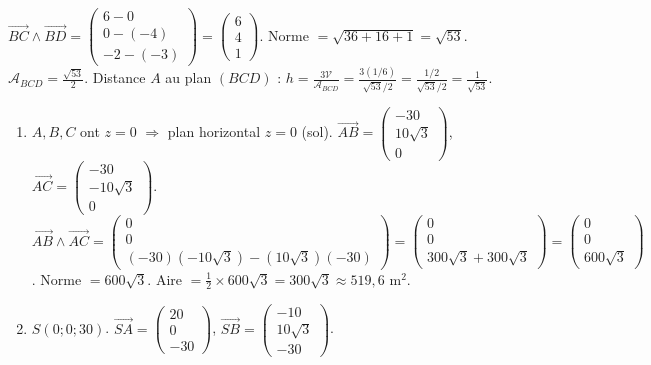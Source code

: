\documentclass[11pt]{article}
\begin{document}
\begin{corrige}[Exercice 2]
\begin{enumerate}
  $\overrightarrow{BC}\wedge\overrightarrow{BD} = \begin{pmatrix} 6-0 \\ 0-(-4) \\ -2-(-3) \end{pmatrix} = \begin{pmatrix}6\\4\\1\end{pmatrix}$. Norme $= \sqrt{36+16+1}=\sqrt{53}$.
  $\mathcal{A}_{BCD} = \frac{\sqrt{53}}{2}$.
  Distance $A$ au plan $(BCD)$ : $h = \frac{3\mathcal{V}}{\mathcal{A}_{BCD}} = \frac{3(1/6)}{\sqrt{53}/2} = \frac{1/2}{\sqrt{53}/2} = \frac{1}{\sqrt{53}}$.
\end{enumerate}
\end{corrige}

\begin{corrige}
\begin{enumerate}
  \item $A,B,C$ ont $z=0$ $\Rightarrow$ plan horizontal $z=0$ (sol).
  $\overrightarrow{AB}=\begin{pmatrix}-30\\10\sqrt{3}\\0\end{pmatrix}$, $\overrightarrow{AC}=\begin{pmatrix}-30\\-10\sqrt{3}\\0\end{pmatrix}$.
  $\overrightarrow{AB}\wedge\overrightarrow{AC} = \begin{pmatrix}0\\0\\ (-30)(-10\sqrt{3}) - (10\sqrt{3})(-30) \end{pmatrix} = \begin{pmatrix}0\\0\\ 300\sqrt{3}+300\sqrt{3} \end{pmatrix} = \begin{pmatrix}0\\0\\600\sqrt{3}\end{pmatrix}$.
  Norme $= 600\sqrt{3}$. Aire $= \frac{1}{2}\times 600\sqrt{3} = 300\sqrt{3} \approx 519,6 \text{ m}^2$.
  \item $S(0;0;30)$. $\overrightarrow{SA}=\begin{pmatrix}20\\0\\-30\end{pmatrix}$, $\overrightarrow{SB}=\begin{pmatrix}-10\\10\sqrt{3}\\-30\end{pmatrix}$.

\end{enumerate}
\end{corrige}
\end{document}
